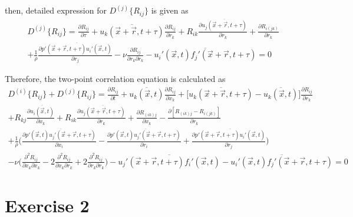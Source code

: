\documentclass[paper=a4, fontsize=11pt]{scrartcl} %
\numberwithin{equation}{section} %
\numberwithin{figure}{section} %
\numberwithin{table}{section} %
\begin{document}
	 then, detailed expression for  $D^{(j)}\{R_{ij}\}$ is given as
	 \begin{equation}
		 \begin{aligned}
		 	D^{(j)}\{R_{ij}\} = \frac{\partial R_{ij}}{\partial \tau} + \overline{u_k(\vec{x} + \vec{r}, t + \tau)} \frac{\partial R_{ij}}{\partial r_k} + R_{ik} \frac{\partial \overline{u_j(\vec{x} + \vec{r}, t + \tau)}}{\partial r_k} + \frac{\partial R_{i(jk)}}{\partial r_k} \\
		 	+ \frac{1}{\rho}\frac{\partial \overline{p'(\vec{x} + \vec{r}, t + \tau)u_i'(\vec{x}, t)}}{\partial r_j} - \nu \frac{\partial R_{ij}}{\partial r_k \partial r_k} - \overline{u_i'(\vec{x}, t) f_j'(\vec{x} + \vec{r}, t + \tau)} = 0
		 \end{aligned}
	 \end{equation}
	 
	 Therefore, the two-point correlation equation is calculated as
	 \begin{equation}
	 	\begin{aligned}
	 		D^{(i)}\{R_{ij}\} + D^{(j)}\{R_{ij}\}
	 		= \frac{\partial R_{ij}}{\partial t}
	 		+ \overline{u_k(\vec{x}, t)} \frac{\partial R_{ij}}{\partial x_k}
	 		+ \Big[\overline{u_k(\vec{x} + \vec{r}, t + \tau)} - \overline{u_k(\vec{x}, t)}\Big]\frac{\partial R_{ij}}{\partial r_k}\\
	 		+ R_{kj}\frac{\partial \overline{u_i(\vec{x}, t)}}{\partial x_k} + R_{ik} \frac{\partial \overline{u_j(\vec{x} + \vec{r}, t + \tau)}}{\partial r_k} 
	 		 + \frac{\partial R_{(ik)j}}{\partial x_k} - \frac{\partial [R_{(ik)j}-R_{i(jk)}]}{\partial r_k}\\
	 		 + \frac{1}{\rho} \Bigg(\frac{\partial \overline{p'(\vec{x}, t) u_j'(\vec{x} + \vec{r}, t+\tau)}}{\partial x_i} - \frac{\partial \overline{p'(\vec{x}, t) u_j'(\vec{x} + \vec{r}, t+\tau)}}{\partial r_i} + \frac{\partial \overline{p'(\vec{x} + \vec{r}, t + \tau)u_i'(\vec{x}, t)}}{\partial r_j}\Bigg) \\ 
	 		 - \nu \Bigg(\frac{\partial^2 R_{ij}}{\partial x_k \partial x_k} - 2\frac{\partial^2 R_{ij}}{\partial x_k \partial r_k} + 2\frac{\partial^2 R_{ij}}{\partial r_k \partial r_k}\Bigg) - \overline{u_j'(\vec{x} + \vec{r}, t+\tau) f_i'(\vec{x}, t)}
	 		 - \overline{u_i'(\vec{x}, t) f_j'(\vec{x} + \vec{r}, t + \tau)} = 0
	 	\end{aligned}
	 \end{equation}
	 
\section{Exercise 2}
	
	
\end{document}
